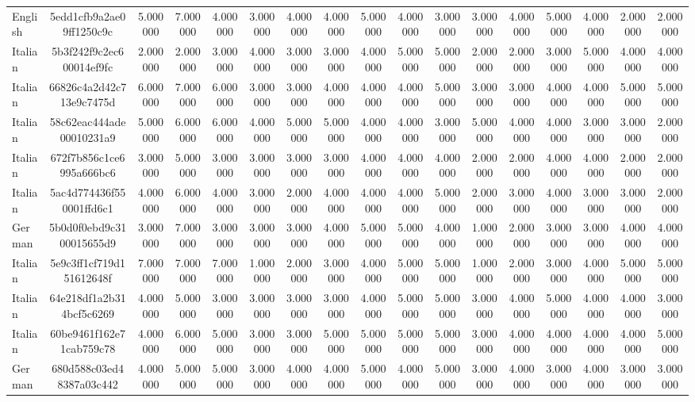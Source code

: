 \begin{table}[htbp]
\begin{tabular}{lcccccccccccccccc}
English & 5edd1cfb9a2ae09ff1250c9c & 5.000000 & 7.000000 & 4.000000 & 3.000000 & 4.000000 & 4.000000 & 5.000000 & 4.000000 & 3.000000 & 3.000000 & 4.000000 & 5.000000 & 4.000000 & 2.000000 & 2.000000 \\
Italian & 5b3f242f9c2ec600014ef9fc & 2.000000 & 2.000000 & 3.000000 & 4.000000 & 3.000000 & 3.000000 & 4.000000 & 5.000000 & 5.000000 & 2.000000 & 2.000000 & 3.000000 & 5.000000 & 4.000000 & 4.000000 \\
Italian & 66826c4a2d42c713e9c7475d & 6.000000 & 7.000000 & 6.000000 & 3.000000 & 3.000000 & 4.000000 & 4.000000 & 4.000000 & 5.000000 & 3.000000 & 3.000000 & 4.000000 & 4.000000 & 5.000000 & 5.000000 \\
Italian & 58c62eac444ade00010231a9 & 5.000000 & 6.000000 & 6.000000 & 4.000000 & 5.000000 & 5.000000 & 4.000000 & 4.000000 & 3.000000 & 5.000000 & 4.000000 & 4.000000 & 3.000000 & 3.000000 & 2.000000 \\
Italian & 672f7b856c1ce6995a666bc6 & 3.000000 & 5.000000 & 3.000000 & 3.000000 & 3.000000 & 3.000000 & 4.000000 & 4.000000 & 4.000000 & 2.000000 & 2.000000 & 4.000000 & 4.000000 & 2.000000 & 2.000000 \\
Italian & 5ac4d774436f550001ffd6c1 & 4.000000 & 6.000000 & 4.000000 & 3.000000 & 2.000000 & 4.000000 & 4.000000 & 4.000000 & 5.000000 & 2.000000 & 3.000000 & 4.000000 & 3.000000 & 3.000000 & 2.000000 \\
German & 5b0d0f0ebd9c3100015655d9 & 3.000000 & 7.000000 & 3.000000 & 3.000000 & 3.000000 & 4.000000 & 5.000000 & 5.000000 & 4.000000 & 1.000000 & 2.000000 & 3.000000 & 3.000000 & 4.000000 & 4.000000 \\
Italian & 5e9c3ff1cf719d151612648f & 7.000000 & 7.000000 & 7.000000 & 1.000000 & 2.000000 & 3.000000 & 4.000000 & 5.000000 & 5.000000 & 1.000000 & 2.000000 & 3.000000 & 4.000000 & 5.000000 & 5.000000 \\
Italian & 64e218df1a2b314bcf5c6269 & 4.000000 & 5.000000 & 3.000000 & 3.000000 & 3.000000 & 3.000000 & 4.000000 & 5.000000 & 5.000000 & 3.000000 & 4.000000 & 5.000000 & 4.000000 & 4.000000 & 3.000000 \\
Italian & 60be9461f162e71cab759c78 & 4.000000 & 6.000000 & 5.000000 & 3.000000 & 3.000000 & 5.000000 & 5.000000 & 5.000000 & 5.000000 & 3.000000 & 4.000000 & 4.000000 & 4.000000 & 4.000000 & 5.000000 \\
German & 680d588c03ed48387a03c442 & 4.000000 & 5.000000 & 5.000000 & 3.000000 & 4.000000 & 4.000000 & 5.000000 & 4.000000 & 5.000000 & 3.000000 & 4.000000 & 3.000000 & 4.000000 & 3.000000 & 3.000000 \\

\end{tabular}
\end{table}
